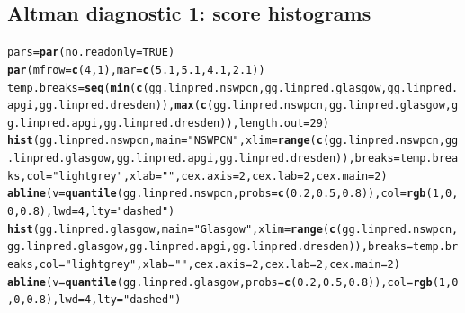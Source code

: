 \documentclass{article}\usepackage[]{graphicx}\usepackage[]{color}
\makeatletter
\newcommand{\hlnum}[1]{\textcolor[rgb]{0.686,0.059,0.569}{#1}}%
\newcommand{\hlstr}[1]{\textcolor[rgb]{0.192,0.494,0.8}{#1}}%
\newcommand{\hlstd}[1]{\textcolor[rgb]{0.345,0.345,0.345}{#1}}%
\newcommand{\hlkwb}[1]{\textcolor[rgb]{0.69,0.353,0.396}{#1}}%
\newcommand{\hlkwc}[1]{\textcolor[rgb]{0.333,0.667,0.333}{#1}}%
\newcommand{\hlkwd}[1]{\textcolor[rgb]{0.737,0.353,0.396}{\textbf{#1}}}%
\newenvironment{kframe}{%
 \def\at@end@of@kframe{}%
 \ifinner\ifhmode%
  \def\at@end@of@kframe{\end{minipage}}%
  \begin{minipage}{\columnwidth}%
 \fi\fi%
 \def\FrameCommand##1{\hskip\@totalleftmargin \hskip-\fboxsep
 \colorbox{shadecolor}{##1}\hskip-\fboxsep
     \hskip-\linewidth \hskip-\@totalleftmargin \hskip\columnwidth}%
 \MakeFramed {\advance\hsize-\width
   \@totalleftmargin\z@ \linewidth\hsize
   \@setminipage}}%
 {\par\unskip\endMakeFramed%
 \at@end@of@kframe}
\newenvironment{knitrout}{}{} %
\makeatother
\begin{document}
\subsection{Altman diagnostic 1: score histograms}
\begin{knitrout}
\color{fgcolor}\begin{kframe}
\begin{alltt}
\hlstd{pars} \hlkwb{=} \hlkwd{par}\hlstd{(}\hlkwc{no.readonly} \hlstd{=} \hlnum{TRUE}\hlstd{)}
\hlkwd{par}\hlstd{(}\hlkwc{mfrow} \hlstd{=} \hlkwd{c}\hlstd{(}\hlnum{4}\hlstd{,} \hlnum{1}\hlstd{),} \hlkwc{mar} \hlstd{=} \hlkwd{c}\hlstd{(}\hlnum{5.1}\hlstd{,} \hlnum{5.1}\hlstd{,} \hlnum{4.1}\hlstd{,} \hlnum{2.1}\hlstd{))}
\hlstd{temp.breaks} \hlkwb{=} \hlkwd{seq}\hlstd{(}\hlkwd{min}\hlstd{(}\hlkwd{c}\hlstd{(gg.linpred.nswpcn, gg.linpred.glasgow, gg.linpred.apgi, gg.linpred.dresden)),} \hlkwd{max}\hlstd{(}\hlkwd{c}\hlstd{(gg.linpred.nswpcn, gg.linpred.glasgow, gg.linpred.apgi, gg.linpred.dresden)),} \hlkwc{length.out} \hlstd{=} \hlnum{29}\hlstd{)}
\hlkwd{hist}\hlstd{(gg.linpred.nswpcn,} \hlkwc{main} \hlstd{=} \hlstr{"NSWPCN"}\hlstd{,} \hlkwc{xlim} \hlstd{=} \hlkwd{range}\hlstd{(}\hlkwd{c}\hlstd{(gg.linpred.nswpcn, gg.linpred.glasgow, gg.linpred.apgi, gg.linpred.dresden)),} \hlkwc{breaks} \hlstd{= temp.breaks,} \hlkwc{col} \hlstd{=} \hlstr{"lightgrey"}\hlstd{,} \hlkwc{xlab} \hlstd{=} \hlstr{""}\hlstd{,} \hlkwc{cex.axis} \hlstd{=} \hlnum{2}\hlstd{,} \hlkwc{cex.lab} \hlstd{=} \hlnum{2}\hlstd{,} \hlkwc{cex.main} \hlstd{=} \hlnum{2}\hlstd{)}
\hlkwd{abline}\hlstd{(}\hlkwc{v} \hlstd{=} \hlkwd{quantile}\hlstd{(gg.linpred.nswpcn,} \hlkwc{probs} \hlstd{=} \hlkwd{c}\hlstd{(}\hlnum{0.2}\hlstd{,} \hlnum{0.5}\hlstd{,} \hlnum{0.8}\hlstd{)),} \hlkwc{col} \hlstd{=} \hlkwd{rgb}\hlstd{(}\hlnum{1}\hlstd{,} \hlnum{0}\hlstd{,} \hlnum{0}\hlstd{,} \hlnum{0.8}\hlstd{),} \hlkwc{lwd} \hlstd{=} \hlnum{4}\hlstd{,} \hlkwc{lty} \hlstd{=} \hlstr{"dashed"}\hlstd{)}
\hlkwd{hist}\hlstd{(gg.linpred.glasgow,} \hlkwc{main} \hlstd{=} \hlstr{"Glasgow"}\hlstd{,} \hlkwc{xlim} \hlstd{=} \hlkwd{range}\hlstd{(}\hlkwd{c}\hlstd{(gg.linpred.nswpcn, gg.linpred.glasgow, gg.linpred.apgi, gg.linpred.dresden)),} \hlkwc{breaks} \hlstd{= temp.breaks,} \hlkwc{col} \hlstd{=} \hlstr{"lightgrey"}\hlstd{,} \hlkwc{xlab} \hlstd{=} \hlstr{""}\hlstd{,} \hlkwc{cex.axis} \hlstd{=} \hlnum{2}\hlstd{,} \hlkwc{cex.lab} \hlstd{=} \hlnum{2}\hlstd{,} \hlkwc{cex.main} \hlstd{=} \hlnum{2}\hlstd{)}
\hlkwd{abline}\hlstd{(}\hlkwc{v} \hlstd{=} \hlkwd{quantile}\hlstd{(gg.linpred.glasgow,} \hlkwc{probs} \hlstd{=} \hlkwd{c}\hlstd{(}\hlnum{0.2}\hlstd{,} \hlnum{0.5}\hlstd{,} \hlnum{0.8}\hlstd{)),} \hlkwc{col} \hlstd{=} \hlkwd{rgb}\hlstd{(}\hlnum{1}\hlstd{,} \hlnum{0}\hlstd{,} \hlnum{0}\hlstd{,} \hlnum{0.8}\hlstd{),} \hlkwc{lwd} \hlstd{=} \hlnum{4}\hlstd{,} \hlkwc{lty} \hlstd{=} \hlstr{"dashed"}\hlstd{)}

\end{alltt}
\end{kframe}
\end{knitrout}
\end{document}

